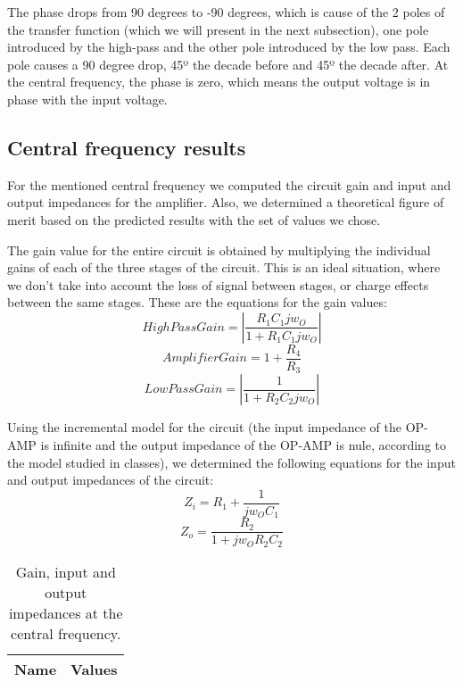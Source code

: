 The phase drops from 90 degrees to -90 degrees, which is cause of the 2 poles of the transfer function (which we will present in the next subsection), one pole introduced by the high-pass and the other pole introduced by the low pass. Each pole causes a 90 degree drop, 45º the decade before and 45º the decade after. At the central frequency, the phase is zero, which means the output voltage is in phase with the input voltage.

\subsection{Central frequency results}
For the mentioned central frequency we computed the circuit gain and input and output impedances for the amplifier. Also, we determined a theoretical figure of merit based on the predicted results with the set of values we chose.

The gain value for the entire circuit is obtained by multiplying the individual gains of each of the three stages of the circuit. This is an ideal situation, where we don't take into account the loss of signal between stages, or charge effects between the same stages.
These are the equations for the gain values:
\begin{equation}
High Pass Gain=|\frac{R_{1}C_{1}jw_{O}}{1+R_{1}C_{1}jw_{O}}|
\end{equation}
\begin{equation}
Amplifier Gain=1+\frac{R_{4}}{R_{3}}
\end{equation}
\begin{equation}
Low Pass Gain=|\frac{1}{1+R_{2}C_{2}jw_{O}}|
\end{equation}

Using the incremental model for the circuit (the input impedance of the OP-AMP is infinite and the output impedance of the OP-AMP is nule, according to the model studied in classes), we determined the following equations for the input and output impedances of the circuit:
\begin{equation}
Z_i = R_1 + \frac{1}{jw_{O}C_{1}}
\end{equation}
\begin{equation}
Z_o = \frac{R_2}{1+jw_OR_2C_2}
\end{equation}

\begin{table}[h!]
  \centering
  \begin{tabular}{|l|r|}
    \hline    
    {\bf Name} & {\bf Values} \\ \hline
     
  \end{tabular}
  \caption{Gain, input and output impedances at the central frequency.}
  \label{tab:data}
\end{table}

